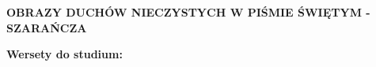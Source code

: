 \documentclass[10pt,a4paper,oneside]{article}
\begin{document}
\centerline{\textbf{\MakeUppercase{Obrazy duchów nieczystych w Piśmie Świętym - szarańcza}}}
\begin{center}
\textbf{Wersety do studium:} 

\end{center}
\end{document}
